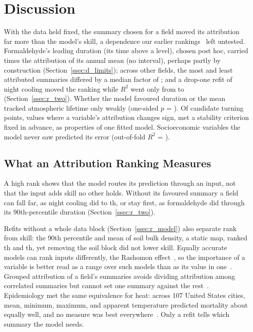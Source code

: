 \documentclass[sensors,article,submit,moreauthors,pdftex]{Definitions/mdpi}
\begin{document}
\section{Discussion}
\label{sec:discussion}
With the data held fixed, the summary chosen for a field moved its attribution
far more than the model's skill, a dependence our earlier
rankings~\cite{Ruwali2026multi, Ahmad2026night, Shrestha2026exp} left untested.
Formaldehyde's leading duration (its time above a level), chosen post hoc, carried \HchoRatio{} times the attribution of
its annual mean (no interval), perhaps partly by construction (Section~\ref{ssec:d_limits}); across \StatFieldsTotal{} other fields, the most and least attributed summaries differed by a median factor of
\CensusMedianSpread{}; and a drop-one refit of night cooling moved the ranking while $R^{2}$ went
only from \RefitFullRtwo{} to \RefitDropRtwo{} (Section~\ref{ssec:r_two}). Whether the model favoured duration or
the mean tracked atmospheric lifetime only weakly (one-sided
$p$ = \LtPermP{}). Of \TpTotal{} candidate turning points, values where a variable's attribution
changes sign, \TpStable{} met a
stability criterion fixed in advance, as properties of one fitted model.
Socioeconomic variables the model never saw predicted its error (out-of-fold $R^{2}$ =
\ResSdohRtwo{}).

\subsection{What an Attribution Ranking Measures}
\label{ssec:d_rashomon}
A high rank shows that the model routes its prediction through an input, not
that the input adds skill no other holds. Without its favoured summary a
field can fall far, as night cooling did to \RefitDropMeanRank{}th, or stay
first, as formaldehyde did through its 90th-percentile duration (Section~\ref{ssec:r_two}).

Refits without a whole data block
(Section~\ref{ssec:r_model}) also separate rank from skill: the 90th percentile and mean of soil bulk
density, a static map, ranked \SoilPninetyRank{}th and \SoilMeanRank{}th, yet
removing the soil block did not lower skill. Equally accurate models can
rank inputs differently, the Rashomon effect~\cite{Breiman2001two}, so
the importance of a variable is better read as a range over such models than
as its value in one~\cite{Fisher2019, Dong2020}. Grouped attribution of a field's summaries
avoids dividing attribution among correlated summaries but cannot set one summary against the
rest~\cite{Au2022}. Epidemiology met the same equivalence for heat: across 107 United
States cities, mean, minimum, maximum, and apparent temperature predicted
mortality about equally well, and no measure was best
everywhere~\cite{Barnett2010}. Only a refit tells which summary the model needs.
\end{document}
